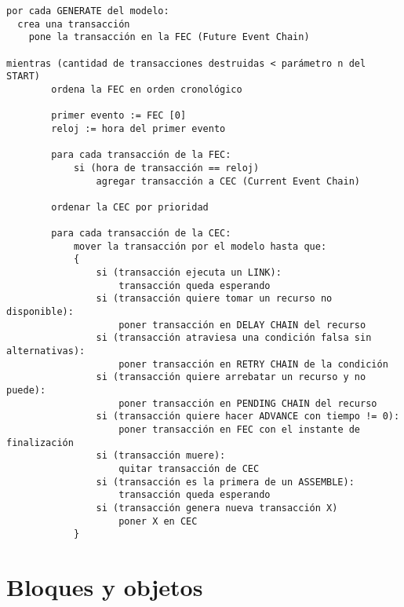 \documentclass[12pt,a4paper, twoside]{paquetes-apunte/apunte}
\begin{document}
\begin{lstlisting}
por cada GENERATE del modelo:
  crea una transacción
	pone la transacción en la FEC (Future Event Chain)

mientras (cantidad de transacciones destruidas < parámetro n del START)
		ordena la FEC en orden cronológico

		primer evento := FEC [0]
		reloj := hora del primer evento
		
		para cada transacción de la FEC:
			si (hora de transacción == reloj)
				agregar transacción a CEC (Current Event Chain)
		
		ordenar la CEC por prioridad
		
		para cada transacción de la CEC:
			mover la transacción por el modelo hasta que: 
			{
				si (transacción ejecuta un LINK):
					transacción queda esperando
				si (transacción quiere tomar un recurso no disponible):
					poner transacción en DELAY CHAIN del recurso
				si (transacción atraviesa una condición falsa sin alternativas):
					poner transacción en RETRY CHAIN de la condición
				si (transacción quiere arrebatar un recurso y no puede):
					poner transacción en PENDING CHAIN del recurso
				si (transacción quiere hacer ADVANCE con tiempo != 0):
					poner transacción en FEC con el instante de finalización
				si (transacción muere):
					quitar transacción de CEC
				si (transacción es la primera de un ASSEMBLE):
					transacción queda esperando
				si (transacción genera nueva transacción X)
					poner X en CEC
			}
\end{lstlisting}



\section{Bloques y objetos}
\end{document}
